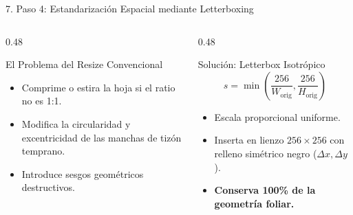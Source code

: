 \documentclass[aspectratio=169,10pt]{beamer}
\begin{document}
\begin{frame}{7. Paso 4: Estandarización Espacial mediante Letterboxing}
    \begin{columns}[T]
        \begin{column}{0.48\textwidth}
            \begin{alertblock}{El Problema del Resize Convencional}
                \begin{itemize}
                    \item Comprime o estira la hoja si el ratio no es 1:1.
                    \item Modifica la circularidad y excentricidad de las manchas de tizón temprano.
                    \item Introduce sesgos geométricos destructivos.
                \end{itemize}
            \end{alertblock}
        \end{column}
        
        \begin{column}{0.48\textwidth}
            \begin{exampleblock}{Solución: Letterbox Isotrópico}
                $$s = \min\left(\frac{256}{W_{\text{orig}}}, \frac{256}{H_{\text{orig}}}\right)$$
                \begin{itemize}
                    \item Escala proporcional uniforme.
                    \item Inserta en lienzo $256 \times 256$ con relleno simétrico negro ($\Delta x, \Delta y$).
                    \item \textbf{Conserva 100\% de la geometría foliar.}
                \end{itemize}
            \end{exampleblock}
        \end{column}
    \end{columns}
\end{frame}
\end{document}
